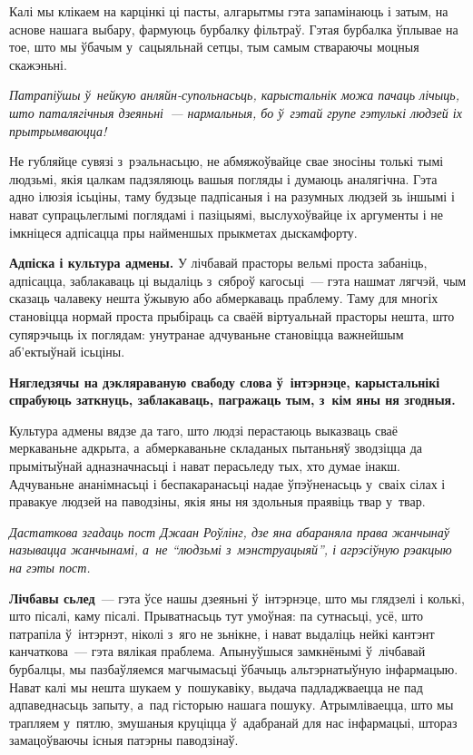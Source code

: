 Калі мы клікаем на карцінкі ці пасты, алгарытмы гэта запамінаюць і затым, на аснове нашага выбару, фармуюць бурбалку фільтраў. Гэтая бурбалка ўплывае на тое, што мы ўбачым у~сацыяльнай сетцы, тым самым ствараючы моцныя скажэньні.

\emph{Патрапіўшы ў~нейкую анляйн-супольнасьць, карыстальнік можа пачаць лічыць, што паталягічныя дзеяньні~--- нармальныя, бо ў~гэтай групе гэтулькі людзей іх прытрымваюцца!}

Не губляйце сувязі з~рэальнасьцю, не абмяжоўвайце свае зносіны толькі тымі людзьмі, якія цалкам падзяляюць вашыя погляды і думаюць аналягічна. Гэта адно ілюзія ісьціны, таму будзьце падпісаныя і на разумных людзей зь іншымі і нават супрацьлеглымі поглядамі і пазіцыямі, выслухоўвайце іх аргументы і не імкніцеся адпісацца пры найменшых прыкметах дыскамфорту.

\textbf{Адпіска і культура адмены.} У лічбавай прасторы вельмі проста забаніць, адпісацца, заблакаваць ці выдаліць з~сяброў кагосьці~--- гэта нашмат лягчэй, чым сказаць чалавеку нешта ўжывую або абмеркаваць праблему. Таму для многіх становіцца нормай проста прыбіраць са сваёй віртуальнай прасторы нешта, што супярэчыць іх поглядам: унутранае адчуваньне становіцца важнейшым аб'ектыўнай ісьціны.

\textbf{Нягледзячы на дэкляраваную свабоду слова ў~інтэрнэце, карыстальнікі спрабуюць заткнуць, заблакаваць, пагражаць тым, з~кім яны ня згодныя.}

Культура адмены вядзе да таго, што людзі перастаюць выказваць сваё меркаваньне адкрыта, а~абмеркаваньне складаных пытаньняў зводзіцца да прымітыўнай адназначнасьці і нават перасьледу тых, хто думае інакш. Адчуваньне ананімнасьці і беспакаранасьці надае ўпэўненасьць у~сваіх сілах і правакуе людзей на паводзіны, якія яны ня здольныя праявіць твар у~твар.

\emph{Дастаткова згадаць пост Джаан Роўлінг, дзе яна абараняла права жанчынаў называцца жанчынамі, а~не ``людзьмі з~мэнструацыяй'', і агрэсіўную рэакцыю на гэты пост.}

\textbf{Лічбавы сьлед}~--- гэта ўсе нашы дзеяньні ў~інтэрнэце, што мы глядзелі і колькі, што пісалі, каму пісалі. Прыватнасьць тут умоўная: па сутнасьці, усё, што патрапіла ў~інтэрнэт, ніколі з~яго не зьнікне, і нават выдаліць нейкі кантэнт канчаткова~--- гэта вялікая праблема. Апынуўшыся замкнёнымі ў~лічбавай бурбалцы, мы пазбаўляемся магчымасьці ўбачыць альтэрнатыўную інфармацыю. Нават калі мы нешта шукаем у~пошукавіку, выдача падладжваецца не пад адпаведнасьць запыту, а~пад гісторыю нашага пошуку. Атрымліваецца, што мы трапляем у~пятлю, змушаныя круціцца ў~адабранай для нас інфармацыі, штораз замацоўваючы існыя патэрны паводзінаў. 

